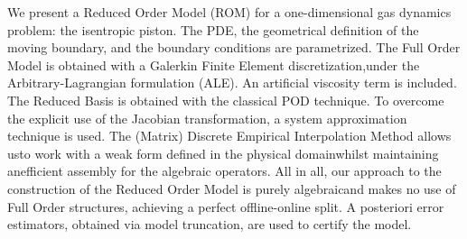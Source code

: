 We present a Reduced Order Model (ROM) for a one-dimensional gas dynamics problem: the isentropic piston.
The PDE, the geometrical definition of the moving boundary, and the boundary conditions are parametrized.
The Full Order Model is obtained with a Galerkin Finite Element discretization,under the Arbitrary-Lagrangian formulation (ALE). An artificial viscosity term is included. The Reduced Basis is obtained with the classical POD technique.
To overcome the explicit use of the Jacobian transformation, a system approximation technique is used.
The (Matrix) Discrete Empirical Interpolation Method allows usto work with a weak form defined in the physical domainwhilst maintaining anefficient assembly for the algebraic operators.
All in all, our approach to the construction of the Reduced Order Model is purely algebraicand makes no use of Full Order structures, achieving a perfect offline-online split. A posteriori error estimators, obtained via model truncation, are used to certify the model.
